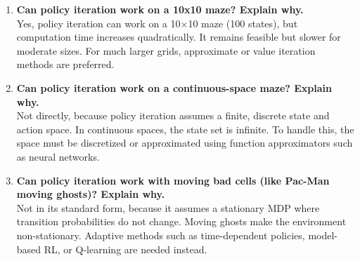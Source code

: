 \documentclass[a4paper,11pt,oneside]{book}
\begin{document}
\begin{enumerate}
    \item \textbf{Can policy iteration work on a 10x10 maze? Explain why.}\\
    Yes, policy iteration can work on a 10×10 maze (100 states), but computation time increases quadratically. It remains feasible but slower for moderate sizes. For much larger grids, approximate or value iteration methods are preferred.

    \item \textbf{Can policy iteration work on a continuous-space maze? Explain why.}\\
    Not directly, because policy iteration assumes a finite, discrete state and action space. In continuous spaces, the state set is infinite. To handle this, the space must be discretized or approximated using function approximators such as neural networks.

    \item \textbf{Can policy iteration work with moving bad cells (like Pac-Man moving ghosts)? Explain why.}\\
    Not in its standard form, because it assumes a stationary MDP where transition probabilities do not change. Moving ghosts make the environment non-stationary. Adaptive methods such as time-dependent policies, model-based RL, or Q-learning are needed instead.
\end{enumerate}

 
\end{document}

